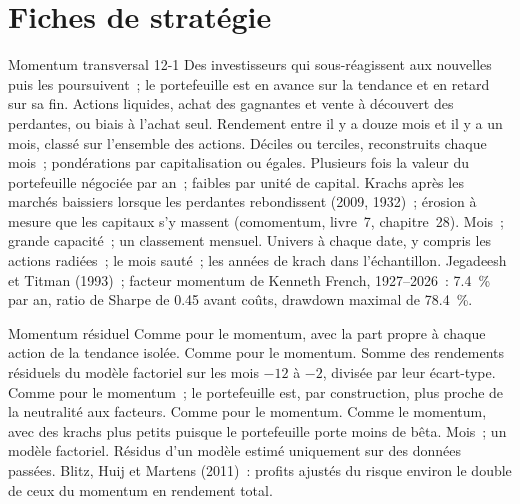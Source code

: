 \section{Fiches de stratégie}

\begin{strategyfile}{Momentum transversal 12-1}\label{strat:s1:momentum:classic}
 Des investisseurs qui sous-réagissent aux nouvelles puis les poursuivent~; le portefeuille est en avance sur la tendance et en retard sur sa fin.
 Actions liquides, achat des gagnantes et vente à découvert des perdantes, ou biais à l'achat seul.
 Rendement entre il y a douze mois et il y a un mois, classé sur l'ensemble des actions.
 Déciles ou terciles, reconstruits chaque mois~; pondérations par capitalisation ou égales.
 Plusieurs fois la valeur du portefeuille négociée par an~; faibles par unité de capital.
 Krachs après les marchés baissiers lorsque les perdantes rebondissent (2009, 1932)~; érosion à mesure que les capitaux s'y massent (comomentum, livre~7, chapitre~28).
 Mois~; grande capacité~; un classement mensuel.
 Univers à chaque date, y compris les actions radiées~; le mois sauté~; les années de krach dans l'échantillon.
 Jegadeesh et Titman (1993)~; facteur momentum de Kenneth French, 1927--2026~: 7.4~\% par an, ratio de Sharpe de 0.45 avant coûts, drawdown maximal de 78.4~\%.
\end{strategyfile}

\begin{strategyfile}{Momentum résiduel}\label{strat:s1:momentum:residual}
 Comme pour le momentum, avec la part propre à chaque action de la tendance isolée.
 Comme pour le momentum.
 Somme des rendements résiduels du modèle factoriel sur les mois $-12$ à $-2$, divisée par leur écart-type.
 Comme pour le momentum~; le portefeuille est, par construction, plus proche de la neutralité aux facteurs.
 Comme pour le momentum.
 Comme le momentum, avec des krachs plus petits puisque le portefeuille porte moins de bêta.
 Mois~; un modèle factoriel.
 Résidus d'un modèle estimé uniquement sur des données passées.
 Blitz, Huij et Martens (2011)~: profits ajustés du risque environ le double de ceux du momentum en rendement total.
\end{strategyfile}

